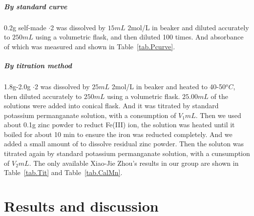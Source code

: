 \documentclass[journal=jacsat,manuscript=article]{achemso}
\begin{document}
\subparagraph{By standard curve}
0.2g self-made $\cdot$2 was dissolved by $15mL$ 2mol/L  in beaker and diluted accurately to $250mL$ using a volumetric flask, and then diluted 100 times. And absorbance of which was measured and shown in Table~\ref{tab.Pcurve}.

\subparagraph{By titration method}
1.8g-2.0g $\cdot$2 was dissolved by $25mL$ 2mol/L  in beaker and heated to 40-50$^oC$, then diluted accurately to $250mL$ using a volumetric flask. $25.00mL$ of the solutions were added into conical flask. And it was titrated by standard potassium permanganate solution, with a consumption of $V_1mL$. Then we used about 0.1g zinc powder to reduct Fe(III) ion, the solution was heated until it boiled for about 10 min to ensure the iron was reducted completely. And we added a small amount of  to dissolve residual zinc powder. Then the soluton was titrated again by standard potassium permanganate solution, with a cunsumption of $V_2mL$. The only available Xiao-Jie Zhou's results in our group are shown in Table~\ref{tab.Tit} and Table~\ref{tab.CalMn}.


\section{Results and discussion}
\end{document}
